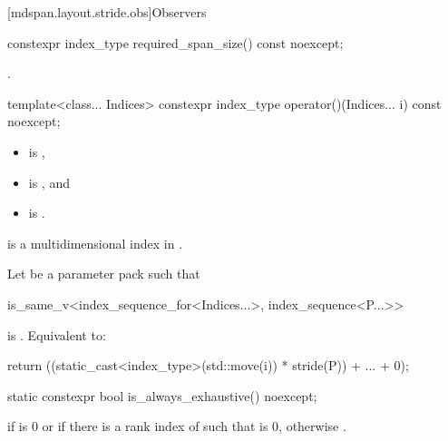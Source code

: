 [mdspan.layout.stride.obs]{Observers}

%
\begin{itemdecl}
constexpr index_type required_span_size() const noexcept;
\end{itemdecl}

\begin{itemdescr}
\pnum
\returns
{}.
\end{itemdescr}

%
\begin{itemdecl}
template<class... Indices>
  constexpr index_type operator()(Indices... i) const noexcept;
\end{itemdecl}

\begin{itemdescr}
\pnum
\constraints
\begin{itemize}
\item
{} is ,
\item
{} is , and
\item
{} is .
\end{itemize}

\pnum
\expects
{} is
a multidimensional index in .

\pnum
\effects
Let  be a parameter pack such that
\begin{codeblock}
is_same_v<index_sequence_for<Indices...>, index_sequence<P...>>
\end{codeblock}
is .
Equivalent to:
\begin{codeblock}
return ((static_cast<index_type>(std::move(i)) * stride(P)) + ... + 0);
\end{codeblock}
\end{itemdescr}

%
\begin{itemdecl}
static constexpr bool is_always_exhaustive() noexcept;
\end{itemdecl}

\begin{itemdescr}
\pnum
\returns
{} if  is 0
or if there is a rank index  of 
such that  is 0,
otherwise .
\end{itemdescr}

